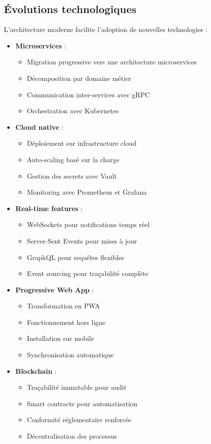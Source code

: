 \documentclass[12pt,a4paper]{report}
\begin{document}
\subsection{Évolutions technologiques}
L'architecture moderne facilite l'adoption de nouvelles technologies :

\begin{itemize}

\item \textbf{Microservices} : 
  \begin{itemize}
  \item Migration progressive vers une architecture microservices
  \item Décomposition par domaine métier
  \item Communication inter-services avec gRPC
  \item Orchestration avec Kubernetes
  \end{itemize}

\item \textbf{Cloud native} : 
  \begin{itemize}
  \item Déploiement sur infrastructure cloud
  \item Auto-scaling basé sur la charge
  \item Gestion des secrets avec Vault
  \item Monitoring avec Prometheus et Grafana
  \end{itemize}

\item \textbf{Real-time features} : 
  \begin{itemize}
  \item WebSockets pour notifications temps réel
  \item Server-Sent Events pour mises à jour
  \item GraphQL pour requêtes flexibles
  \item Event sourcing pour traçabilité complète
  \end{itemize}

\item \textbf{Progressive Web App} : 
  \begin{itemize}
  \item Transformation en PWA
  \item Fonctionnement hors ligne
  \item Installation sur mobile
  \item Synchronisation automatique
  \end{itemize}

\item \textbf{Blockchain} : 
  \begin{itemize}
  \item Traçabilité immutable pour audit
  \item Smart contracts pour automatisation
  \item Conformité réglementaire renforcée
  \item Décentralisation des processus
  \end{itemize}
\end{itemize}
\end{document}
